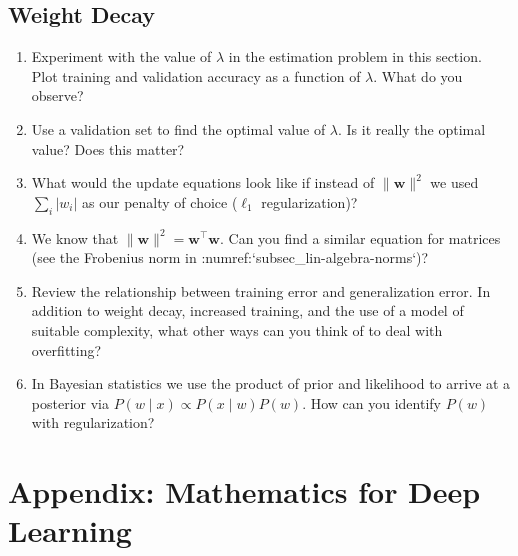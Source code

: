 \documentclass{article}
\begin{document}
\subsection{Weight Decay}
\begin{enumerate}
\item Experiment with the value of $\lambda$ in the estimation problem in this section. Plot training and validation accuracy as a function of $\lambda$. What do you observe?

\item Use a validation set to find the optimal value of $\lambda$. Is it really the optimal value? Does this matter?

\item What would the update equations look like if instead of $\|\mathbf{w}\|^2$ we used $\sum_i |w_i|$ as our penalty of choice ($\ell_1$ regularization)?

\item We know that $\|\mathbf{w}\|^2 = \mathbf{w}^\top \mathbf{w}$. Can you find a similar equation for matrices (see the Frobenius norm in :numref:`subsec_lin-algebra-norms`)?

\item Review the relationship between training error and generalization error. In addition to weight decay, increased training, and the use of a model of suitable complexity, what other ways can you think of to deal with overfitting?

\item In Bayesian statistics we use the product of prior and likelihood to arrive at a posterior via $P(w \mid x) \propto P(x \mid w) P(w)$. How can you identify $P(w)$ with regularization?
\end{enumerate}

\newpage
\setcounter{section}{22}
\section{Appendix: Mathematics for Deep Learning}
\end{document}
